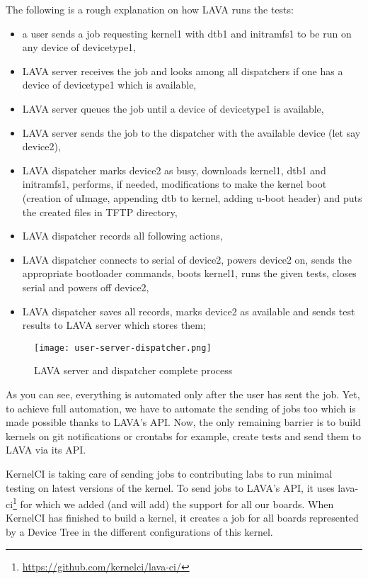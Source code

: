 The following is a rough explanation on how LAVA runs the tests:
\begin{itemize}
  \item a user sends a job requesting kernel1 with dtb1 and initramfs1 to be run on any device of devicetype1,
  \item LAVA server receives the job and looks among all dispatchers if one has a device of devicetype1 which is available,
  \item LAVA server queues the job until a device of devicetype1 is available,
  \item LAVA server sends the job to the dispatcher with the available device (let say device2),
  \item LAVA dispatcher marks device2 as busy, downloads kernel1, dtb1 and initramfs1, performs, if needed, modifications to make the kernel boot (creation of uImage, appending dtb to kernel, adding u-boot header) and puts the created files in TFTP directory,
  \item LAVA dispatcher records all following actions,
  \item LAVA dispatcher connects to serial of device2, powers device2 on, sends the appropriate bootloader commands, boots kernel1, runs the given tests, closes serial and powers off device2,
  \item LAVA dispatcher saves all records, marks device2 as available and sends test results to LAVA server which stores them;
\end{itemize}

\begin{figure}[H]
  \texttt{[image: user-server-dispatcher.png]}
  \caption{LAVA server and dispatcher complete process}
\end{figure}

As you can see, everything is automated only after the user has sent the job. Yet, to achieve full automation, we have to automate the sending of jobs too which is made possible thanks to LAVA's API. Now, the only remaining barrier is to build kernels on git notifications or crontabs for example, create tests and send them to LAVA via its API.

KernelCI is taking care of sending jobs to contributing labs to run minimal testing on latest versions of the kernel. To send jobs to LAVA's API, it uses lava-ci\footnote{\url{https://github.com/kernelci/lava-ci/}} for which we added (and will add) the support for all our boards. When KernelCI has finished to build a kernel, it creates a job for all boards represented by a Device Tree in the different configurations of this kernel.

